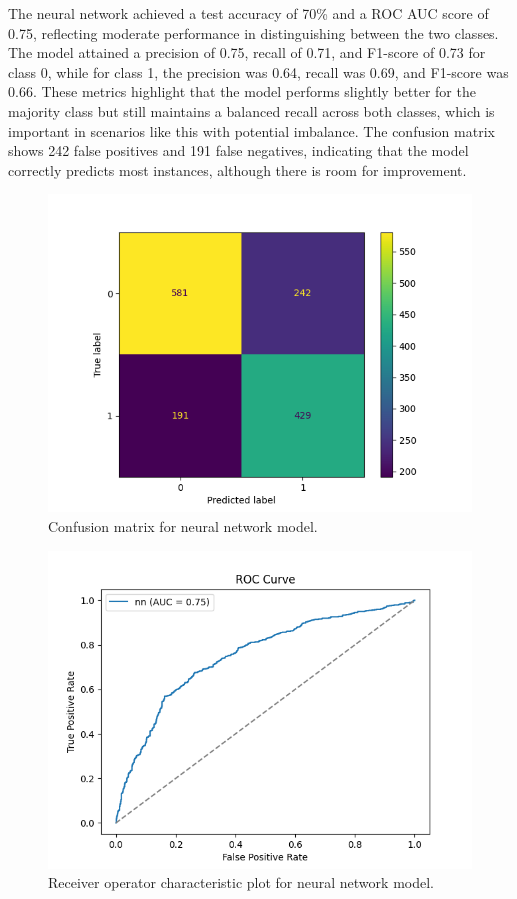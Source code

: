 The neural network achieved a test accuracy of 70\% and a ROC AUC score of 0.75, reflecting moderate performance in distinguishing between the two classes. The model attained a precision of 0.75, recall of 0.71, and F1-score of 0.73 for class 0, while for class 1, the precision was 0.64, recall was 0.69, and F1-score was 0.66. These metrics highlight that the model performs slightly better for the majority class but still maintains a balanced recall across both classes, which is important in scenarios like this with potential imbalance. The confusion matrix shows 242 false positives and 191 false negatives, indicating that the model correctly predicts most instances, although there is room for improvement.


\begin{figure}[H]
	\centering
	\includegraphics[width=0.7\linewidth]{img/nn_cm}
	\caption{Confusion matrix for neural network model.}
	\label{fig:nncm}
\end{figure}

\begin{figure}[H]
	\centering
	\includegraphics[width=0.7\linewidth]{img/nn_roc}
	\caption{Receiver operator characteristic plot for neural network model.}
	\label{fig:nnroc}
\end{figure}


